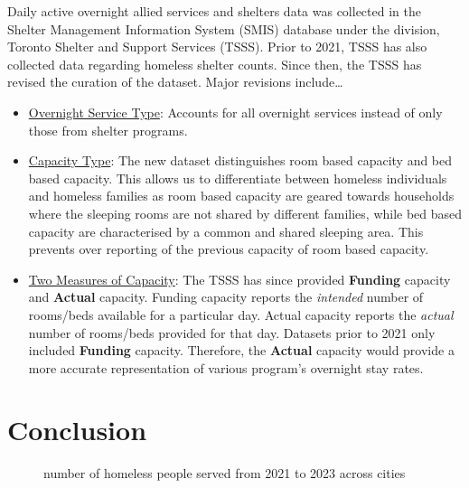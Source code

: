 \documentclass[
  letterpaper,
  DIV=11,
  numbers=noendperiod]{scrartcl}
\begin{document}
Daily active overnight allied services and shelters data was collected
in the Shelter Management Information System (SMIS) database under the
division, Toronto Shelter and Support Services (TSSS). Prior to 2021,
TSSS has also collected data regarding homeless shelter counts. Since
then, the TSSS has revised the curation of the dataset. Major revisions
include\ldots{}

\begin{itemize}
\item
  \ul{Overnight Service Type}: Accounts for all overnight services
  instead of only those from shelter programs.
\item
  \ul{Capacity Type}: The new dataset distinguishes room based capacity
  and bed based capacity. This allows us to differentiate between
  homeless individuals and homeless families as room based capacity are
  geared towards households where the sleeping rooms are not shared by
  different families, while bed based capacity are characterised by a
  common and shared sleeping area. This prevents over reporting of the
  previous capacity of room based capacity.
\item
  \ul{Two Measures of Capacity}: The TSSS has since provided
  \textbf{Funding} capacity and \textbf{Actual} capacity. Funding
  capacity reports the \emph{intended} number of rooms/beds available
  for a particular day. Actual capacity reports the \emph{actual} number
  of rooms/beds provided for that day. Datasets prior to 2021 only
  included \textbf{Funding} capacity. Therefore, the \textbf{Actual}
  capacity would provide a more accurate representation of various
  program's overnight stay rates.
\end{itemize}

\section{Conclusion}\label{sec-conclusion}

\begin{figure}


\caption{\label{fig-homelessness_across_cities}number of homeless people
served from 2021 to 2023 across cities}

\end{figure}%
\end{document}
